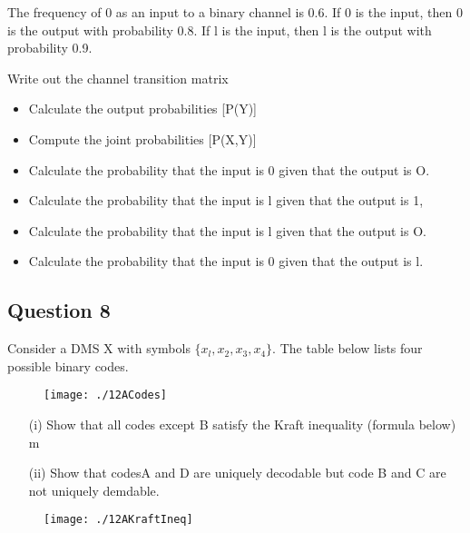 \documentclass[a4paper,12pt]{article}
\begin{document}
The frequency of 0 as an input to a binary channel is 0.6. If 0 is the input, then 0 is the output with probability 0.8. If l is the input, then l is the output with probability 0.9.

Write out the channel transition matrix

\begin{itemize}
\item	Calculate the output probabilities [P(Y)] 
\item	Compute the joint probabilities [P(X,Y)]
\item	Calculate the probability that the input is 0 given that the output is O. 
\item Calculate the probability that the input is l given that the output is 1, 
\item	Calculate the probability that the input is l given that the output is O.
\item	Calculate the probability that the input is 0 given that the output is l. 
\end{itemize}


\subsection*{Question 8 }
Consider a DMS X with symbols $\{x_l,x_2,x_3,x_4\}$. The table below lists four possible
binary codes.

\begin{figure}[h!]
\centering
\texttt{[image: ./12ACodes]}
\caption{}
\label{fig:12ACodes}
\end{figure}



\begin{itemize}
\item[(i)] Show that all codes except B satisfy the Kraft inequality (formula below)
m
\item[(ii)] Show that codesA and D are uniquely decodable but code B and C are not
uniquely demdable.
\end{itemize}
\begin{figure}[h!]
\centering
\texttt{[image: ./12AKraftIneq]}
\caption{}
\label{fig:12AKraftIneq}
\end{figure}
\end{document}
